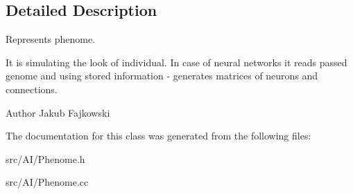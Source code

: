 \subsection{Detailed Description}
Represents phenome. 

It is simulating the look of individual. In case of neural networks it reads passed genome and using stored information -\/ generates matrices of neurons and connections. \begin{DoxyAuthor}{Author}
Jakub Fajkowski 
\end{DoxyAuthor}


The documentation for this class was generated from the following files\+:\begin{DoxyCompactItemize}
\item 
src/\+A\+I/Phenome.\+h\item 
src/\+A\+I/Phenome.\+cc\end{DoxyCompactItemize}
